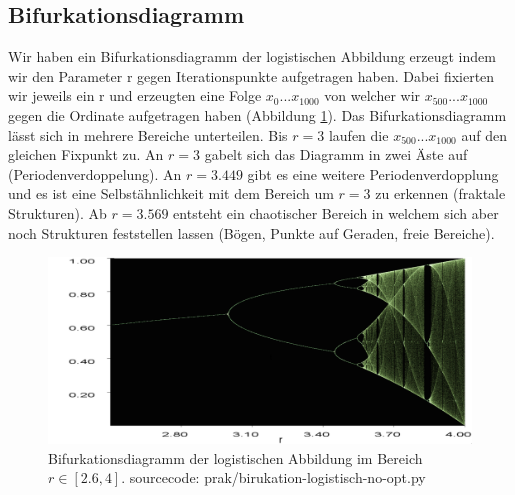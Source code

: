 \documentclass[11,5pt, twoside]{article}
\begin{document}
\subsection{Bifurkationsdiagramm}
Wir haben ein Bifurkationsdiagramm der logistischen Abbildung erzeugt indem wir den Parameter r gegen Iterationspunkte aufgetragen haben. Dabei fixierten wir jeweils ein r und erzeugten eine Folge $x_0 ... x_{1000}$ von welcher wir $x_{500} ... x_{1000}$ gegen die Ordinate aufgetragen haben (Abbildung \ref{fig:bifurkation-sin-nice}).
Das Bifurkationsdiagramm lässt sich in mehrere Bereiche unterteilen. Bis $r=3$ laufen die $x_{500}...x_{1000}$ auf den gleichen Fixpunkt zu. An $r=3$ gabelt sich das Diagramm in zwei Äste auf (Periodenverdoppelung). An $r=3.449$ gibt es eine weitere Periodenverdopplung und es ist eine Selbstähnlichkeit mit dem Bereich um $r=3$ zu erkennen (fraktale Strukturen). Ab $r=3.569$ entsteht ein chaotischer Bereich in welchem sich aber noch Strukturen feststellen lassen (Bögen, Punkte auf Geraden, freie Bereiche).
\begin{figure}[!htbp]
	\centering
	\includegraphics[scale=0.30]{bifurkation}
	\caption{Bifurkationsdiagramm der logistischen Abbildung im Bereich $r\in[2.6,4]$. sourcecode: prak/birukation-logistisch-no-opt.py}
	\label{fig:bifurkation-sin-nice}
\end{figure}
\end{document}
